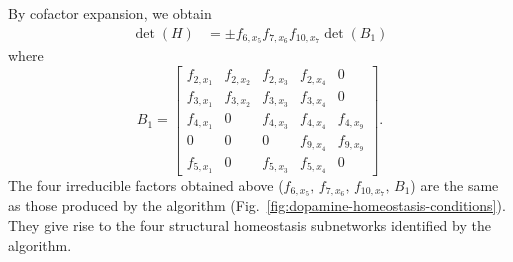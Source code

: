 \documentclass[pdflatex,sn-basic,Numbered]{sn-jnl}
\theoremstyle{thmstyleone}%
\numberwithin{equation}{section}
\begin{document}
By cofactor expansion, we obtain 
\begin{equation}
\begin{aligned}
\det(H) &= \pm f_{6,x_5} f_{7,x_6} f_{10,x_7} \det(B_1) 
\end{aligned}
\end{equation}
where 
\[
B_1=
\left[\begin{array}{ccccc}
f_{2, x_{1}} & f_{2, x_{2}} & f_{2, x_{3}} & f_{2, x_{4}} & 0\\
f_{3, x_{1}} & f_{3, x_{2}} & f_{3, x_{3}} & f_{3, x_{4}} & 0\\
f_{4, x_{1}} & 0 & f_{4, x_{3}} & f_{4, x_{4}} & f_{4, x_{9}}\\
0 & 0 & 0 & f_{9, x_{4}} & f_{9, x_{9}}\\
f_{5, x_{1}} & 0 & f_{5, x_{3}} & f_{5, x_{4}} & 0
\end{array}\right].
\]
The four irreducible factors obtained above ($f_{6,x_5},\,f_{7,x_6},\,f_{10,x_7},\, B_1$) are the same as those produced by the algorithm (Fig.~\ref{fig:dopamine-homeostasis-conditions}). They give rise to the four structural homeostasis subnetworks identified by the algorithm.


\end{document}
